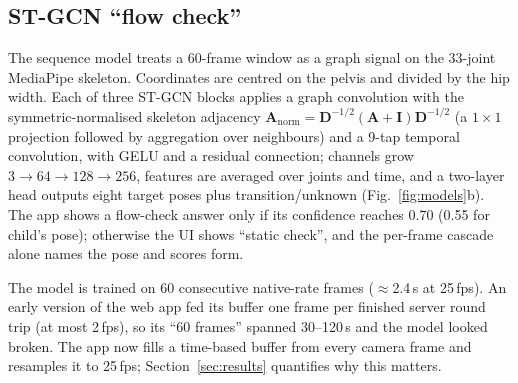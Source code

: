 \subsection{ST-GCN ``flow check''}\label{sec:stgcn}
The sequence model treats a 60-frame window as a graph signal on the 33-joint MediaPipe skeleton. Coordinates are centred on the pelvis and divided by the hip width. Each of three ST-GCN blocks \cite{yan2018stgcn} applies a graph convolution with the symmetric-normalised skeleton adjacency $\mathbf{A}_{\mathrm{norm}}=\mathbf{D}^{-1/2}(\mathbf{A}+\mathbf{I})\mathbf{D}^{-1/2}$ (a $1{\times}1$ projection followed by aggregation over neighbours) and a 9-tap temporal convolution, with GELU and a residual connection; channels grow $3\to64\to128\to256$, features are averaged over joints and time, and a two-layer head outputs eight target poses plus transition/unknown (Fig.~\ref{fig:models}b). The app shows a flow-check answer only if its confidence reaches 0.70 (0.55 for child's pose); otherwise the UI shows ``static check'', and the per-frame cascade alone names the pose and scores form.

 The model is trained on 60 consecutive native-rate frames ($\approx$2.4\,s at 25\,fps). An early version of the web app fed its buffer one frame per finished server round trip (at most 2\,fps), so its ``60 frames'' spanned 30--120\,s and the model looked broken. The app now fills a time-based buffer from every camera frame and resamples it to 25\,fps; Section~\ref{sec:results} quantifies why this matters.
